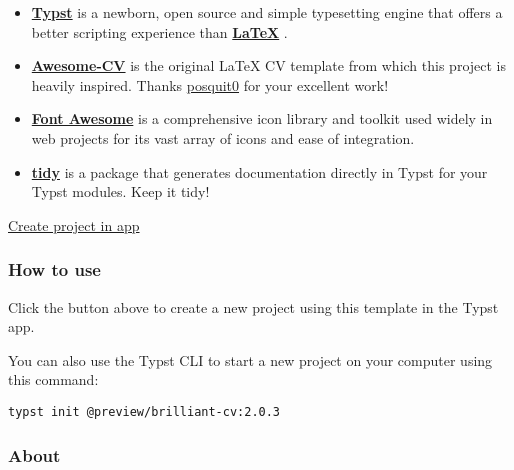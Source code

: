 \begin{itemize}
\tightlist
\item
  \href{https://github.com/typst/typst}{\textbf{Typst}} is a newborn,
  open source and simple typesetting engine that offers a better
  scripting experience than
  \href{https://www.latex-project.org/}{\textbf{LaTeX}} .
\item
  \href{https://github.com/posquit0/Awesome-CV}{\textbf{Awesome-CV}} is
  the original LaTeX CV template from which this project is heavily
  inspired. Thanks \href{https://github.com/posquit0}{posquit0} for your
  excellent work!
\item
  \href{https://fontawesome.com/}{\textbf{Font Awesome}} is a
  comprehensive icon library and toolkit used widely in web projects for
  its vast array of icons and ease of integration.
\item
  \href{https://github.com/Mc-Zen/tidy}{\textbf{tidy}} is a package that
  generates documentation directly in Typst for your Typst modules. Keep
  it tidy!
\end{itemize}

\href{/app?template=brilliant-cv&version=2.0.3}{Create project in app}

\subsubsection{How to use}\label{how-to-use}

Click the button above to create a new project using this template in
the Typst app.

You can also use the Typst CLI to start a new project on your computer
using this command:

\begin{verbatim}
typst init @preview/brilliant-cv:2.0.3
\end{verbatim}



\subsubsection{About}\label{about}

